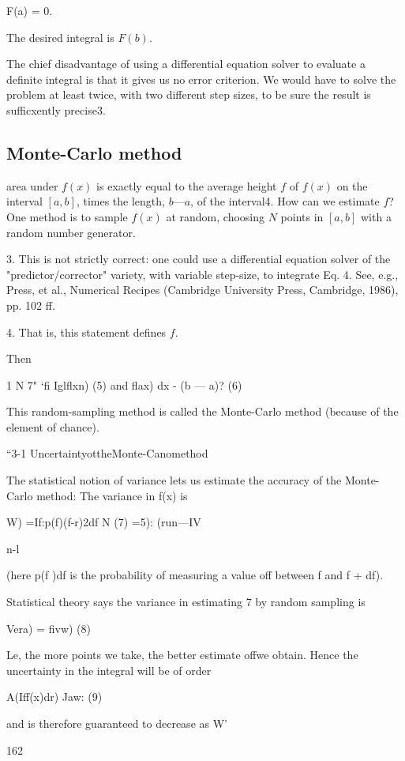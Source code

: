 F(a) = 0.

The desired integral is $F(b)$.

The chief disadvantage of using a differential equation solver to evaluate a deﬁnite integral is that it gives us no error criterion. We would have to solve the problem at least twice, with two different step sizes, to be sure the result is sufficxently precise3.

\subsection{Monte-Carlo method}
 area under $f(x)$ is exactly equal to the average height $f$ of $f(x)$ on the interval $[a, b]$, times the length, $b—a$, of the interval4. How can we estimate $f$? One method is to sample $f(x)$ at random, choosing $N$ points in $[a,b]$ with a random number generator.

3. This is not strictly correct: one could use a differential equation solver of the "predictor/corrector" variety, with variable step-size, to integrate Eq. 4. See, e.g., Press, et al., Numerical Recipes (Cambridge University Press, Cambridge, 1986), pp. 102 ff.

4. That is, this statement defines $f$.

Then

1 N
7" ‘ﬁ Iglﬂxn) (5)
and
ﬂax) dx - (b — a)? (6)

This random-sampling method is called the Monte-Carlo method
(because of the element of chance).

“3-1 UncertaintyottheMonte-Canomethod

The statistical notion of variance lets us estimate the accuracy of
the Monte-Carlo method: The variance in f(x) is

W) =If:p(f)(f-r)2df
N (7)
=5): (run—IV

n-l

(here p(f )df is the probability of measuring a value off between
f and f + df).

Statistical theory says the variance in estimating 7 by random
sampling is

Vera) = ﬁvw) (8)

Le, the more points we take, the better estimate offwe obtain.
Hence the uncertainty in the integral will be of order

A(Iff(x)dr) Jaw: (9)

and is therefore guaranteed to decrease as W'

162

